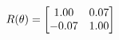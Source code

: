 \documentclass[preview]{standalone}
\begin{document}
\begin{align*}
\special{dvisvgm:raw <g id='unique000'>}R(\theta) = \begin{bmatrix}1.00 & 0.07\\-0.07 & 1.00\end{bmatrix}\special{dvisvgm:raw </g>}
\end{align*}
\end{document}
